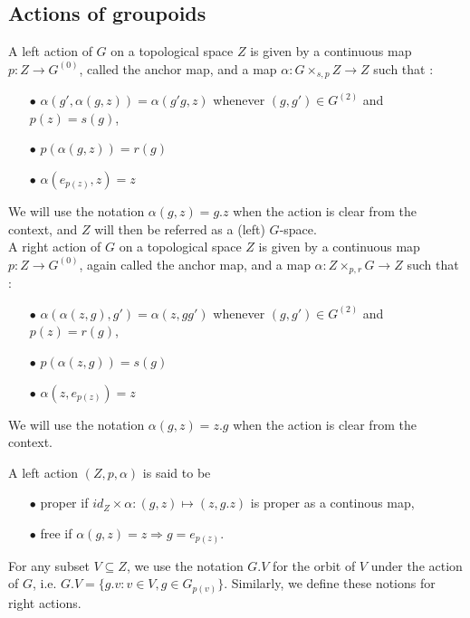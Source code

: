 \subsection{Actions of groupoids}

\begin{definition}
A left action of $G$ on a topological space $Z$ is given by a continuous map $p : Z \rightarrow G^{(0)}$, called the anchor map, and a map $\alpha : G\times_{s,p} Z \rightarrow Z $ such that :
\begin{itemize}
\item[$\bullet$] $\alpha(g',\alpha(g,z)) = \alpha(g'g,z)$ whenever $(g,g')\in G^{(2)}$ and $p(z)=s(g)$,
\item[$\bullet$] $p(\alpha(g,z))= r(g)$
\item[$\bullet$] $\alpha(e_{p(z)},z)=z$
\end{itemize} 
We will use the notation $\alpha(g,z) = g.z$ when the action is clear from the context, and $Z$ will then be referred as a (left) $G$-space.\\

A right action of $G$ on a topological space $Z$ is given by a continuous map $p : Z \rightarrow G^{(0)}$, again called the anchor map, and a map $\alpha : Z\times_{p,r} G \rightarrow Z $ such that :
\begin{itemize}
\item[$\bullet$] $\alpha(\alpha(z,g),g') = \alpha(z, gg')$ whenever $(g,g')\in G^{(2)}$ and $p(z)=r(g)$,
\item[$\bullet$] $p(\alpha(z,g))= s(g)$
\item[$\bullet$] $\alpha(z,e_{p(z)})=z$
\end{itemize} We will use the notation $\alpha(g,z) = z.g$ when the action is clear from the context.\\ 
\end{definition}

A left action $(Z,p,\alpha)$ is said to be 
\begin{itemize}
\item[$\bullet$] proper if $id_Z \times \alpha : (g,z) \mapsto (z,g.z) $ is proper as a continous map,
\item[$\bullet$] free if $\alpha(g,z)=z \Rightarrow g=e_{p(z)} $.
\end{itemize}
For any subset $V \subseteq Z$, we use the notation $G.V$ for the orbit of $V$ under the action of $G$, i.e. $G.V = \{g.v : v\in V, g \in G_{p(v)}\}$. Similarly, we define these notions for right actions.\\


